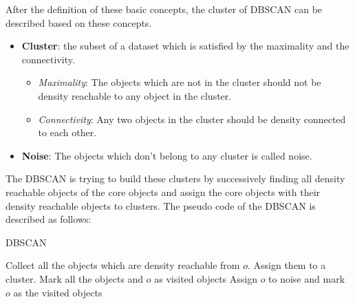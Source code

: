 After the definition of these basic concepts, the cluster of DBSCAN can be described based on these concepts. 
\begin{itemize}
\item \textbf{Cluster}: the subset of a dataset which is satisfied by the maximality and the connectivity.
\begin{itemize}
\item \emph{Maximality}:  The objects which are not in the cluster should not be density reachable to any object in the cluster.
\item \emph{Connectivity}: Any two objects in the cluster should be density connected to each other.
\end{itemize}
\item \textbf{Noise}: The objects which don't belong to any cluster is called noise.
\end{itemize}
The DBSCAN is trying to build these clusters by successively finding all density reachable objects of the core objects and assign the core objects with their density reachable objects to clusters. The pseudo code of the DBSCAN is described as follows:
\begin{algorithm}
\caption{DBSCAN}
\begin{algorithmic}
\STATE Collect all the objects which are density reachable from $o$. Assign them to a cluster.
\newline Mark all the objects and $o$ as visited objects
\ELSE
\STATE Assign $o$ to noise and mark $o$ as the visited objects
\ENDIF
\ENDFOR
\end{algorithmic}
\end{algorithm}

